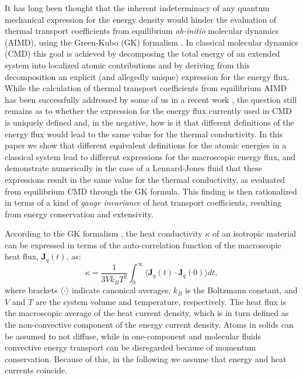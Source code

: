 \newpage It has long been thought that the inherent indeterminacy of
any quantum mechanical expression for the energy density would hinder
the evaluation of thermal transport coefficients from equilibrium
\emph{ab-initio} molecular dynamics (AIMD), using the Green-Kubo (GK)
formalism \cite{Green:1954,Kubo:1957,Kadanoff:1963,Forster}.  In
classical molecular dynamics (CMD) this goal is achieved by
decomposing the total energy of an extended system into localized
atomic contributions and by deriving from this decomposition an
explicit (and allegedly unique) expression for the energy flux. While
the calculation of thermal transport coefficients from equilibrium
AIMD has been successfully addressed by some of us in a recent work
\cite{Marcolongo:2015}, the question still remains as to whether the
expression for the energy flux currently used in CMD is uniquely
defined and, in the negative, how is it that different definitions of
the energy flux would lead to the same value for the thermal
conductivity. In this paper we show that different equivalent
definitions for the atomic energies in a classical system lead to
different expressions for the macroscopic energy flux, and demonstrate
numerically in the case of a Lennard-Jones fluid that these
expressions result in the same value for the thermal conductivity, as
evaluated from equilibrium CMD through the GK formula.  This finding
is then rationalized in terms of a kind of \emph{gauge invariance} of
heat transport coefficients, resulting from energy conservation and
extensivity.

According to the GK formalism
\cite{Green:1954,Kubo:1957,Kadanoff:1963,Forster}, the heat
conductivity $\kappa$ of an isotropic material can be expressed in
terms of the auto-correlation function of the macroscopic heat flux,
$\mathbf{J}_{q}(t)$, as:
\begin{equation}
  \kappa=\frac{1}{3Vk_{B}T^{2}}\int_{0}^{\infty}\langle
  \mathbf{J}_{q}(t) \cdot\mathbf{J}_{q}(0)\rangle
  dt,\label{eq:Green-Kubo} 
\end{equation}
where brackets $\langle\cdot\rangle$ indicate canonical averages,
$k_{B}$ is the Boltzmann constant, and $V$ and $T$ are the system
volume and temperature, respectively. The heat flux is the macroscopic
average of the heat current density, which is in turn defined as the
non-convective component of the energy current density. Atoms in
solids can be assumed to not diffuse, while in one-component and
molecular fluids convective energy transport can
be disregarded because of momentum conservation. Because of this, in
the following we assume that energy and heat currents coincide.

